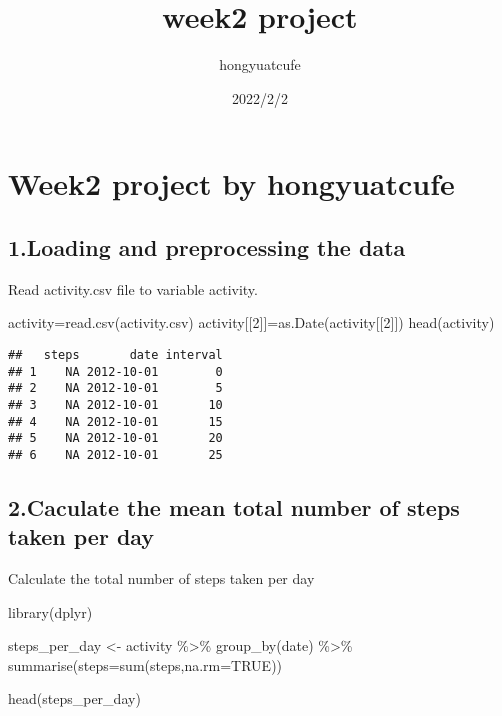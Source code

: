 \documentclass[]{article}
\title{week2 project}
\author{hongyuatcufe}
\date{2022/2/2}
\newenvironment{Shaded}{\begin{snugshade}}{\end{snugshade}}
\newcommand{\AttributeTok}[1]{\textcolor[rgb]{0.77,0.63,0.00}{#1}}
\newcommand{\ConstantTok}[1]{\textcolor[rgb]{0.00,0.00,0.00}{#1}}
\newcommand{\DecValTok}[1]{\textcolor[rgb]{0.00,0.00,0.81}{#1}}
\newcommand{\FunctionTok}[1]{\textcolor[rgb]{0.00,0.00,0.00}{#1}}
\newcommand{\NormalTok}[1]{#1}
\newcommand{\OtherTok}[1]{\textcolor[rgb]{0.56,0.35,0.01}{#1}}
\newcommand{\SpecialCharTok}[1]{\textcolor[rgb]{0.00,0.00,0.00}{#1}}
\newcommand{\StringTok}[1]{\textcolor[rgb]{0.31,0.60,0.02}{#1}}
\begin{document}
\maketitle

\hypertarget{week2-project-by-hongyuatcufe}{%
\section{Week2 project by
hongyuatcufe}\label{week2-project-by-hongyuatcufe}}

\hypertarget{loading-and-preprocessing-the-data}{%
\subsection{1.Loading and preprocessing the
data}\label{loading-and-preprocessing-the-data}}

Read activity.csv file to variable activity.

\begin{Shaded}
\begin{Highlighting}[]
\NormalTok{activity}\OtherTok{=}\FunctionTok{read.csv}\NormalTok{(}\StringTok{\textquotesingle{}activity.csv\textquotesingle{}}\NormalTok{)}
\NormalTok{activity[[}\DecValTok{2}\NormalTok{]]}\OtherTok{=}\FunctionTok{as.Date}\NormalTok{(activity[[}\DecValTok{2}\NormalTok{]])}
\FunctionTok{head}\NormalTok{(activity)}
\end{Highlighting}
\end{Shaded}

\begin{verbatim}
##   steps       date interval
## 1    NA 2012-10-01        0
## 2    NA 2012-10-01        5
## 3    NA 2012-10-01       10
## 4    NA 2012-10-01       15
## 5    NA 2012-10-01       20
## 6    NA 2012-10-01       25
\end{verbatim}

\hypertarget{caculate-the-mean-total-number-of-steps-taken-per-day}{%
\subsection{2.Caculate the mean total number of steps taken per
day}\label{caculate-the-mean-total-number-of-steps-taken-per-day}}

Calculate the total number of steps taken per day

\begin{Shaded}
\begin{Highlighting}[]
\FunctionTok{library}\NormalTok{(dplyr)}

\NormalTok{steps\_per\_day }\OtherTok{\textless{}{-}}\NormalTok{ activity }\SpecialCharTok{\%\textgreater{}\%}
  \FunctionTok{group\_by}\NormalTok{(date) }\SpecialCharTok{\%\textgreater{}\%}
  \FunctionTok{summarise}\NormalTok{(}\AttributeTok{steps=}\FunctionTok{sum}\NormalTok{(steps,}\AttributeTok{na.rm=}\ConstantTok{TRUE}\NormalTok{))}

\FunctionTok{head}\NormalTok{(steps\_per\_day)}
\end{Highlighting}
\end{Shaded}
\end{document}
